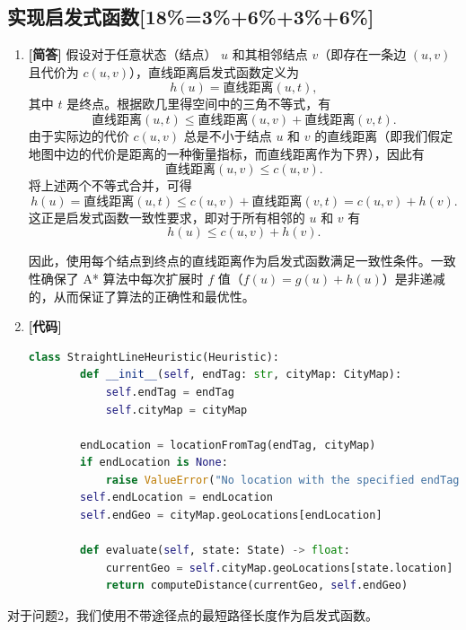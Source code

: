 \documentclass{article}
\begin{document}
\subsection{实现启发式函数[18\%=3\%+6\%+3\%+6\%]}

\begin{enumerate}[label=(\alph*), start=2]
    \item \textbf{[简答]} %
    假设对于任意状态（结点） $u$ 和其相邻结点 $v$（即存在一条边 $(u,v)$ 且代价为 $c(u,v)$），直线距离启发式函数定义为
    \[
    h(u) = \text{直线距离}(u, t),
    \]
    其中 $t$ 是终点。根据欧几里得空间中的三角不等式，有
    \[
    \text{直线距离}(u,t) \leq \text{直线距离}(u,v) + \text{直线距离}(v,t).
    \]
    由于实际边的代价 $c(u,v)$ 总是不小于结点 $u$ 和 $v$ 的直线距离（即我们假定地图中边的代价是距离的一种衡量指标，而直线距离作为下界），因此有
    \[
    \text{直线距离}(u,v) \leq c(u,v).
    \]
    将上述两个不等式合并，可得
    \[
    h(u) = \text{直线距离}(u,t) \leq c(u,v) + \text{直线距离}(v,t) = c(u,v) + h(v).
    \]
    这正是启发式函数一致性要求，即对于所有相邻的 $u$ 和 $v$ 有
    \[
    h(u) \leq c(u,v) + h(v).
    \]
    
    因此，使用每个结点到终点的直线距离作为启发式函数满足一致性条件。一致性确保了 A* 算法中每次扩展时 $f$ 值（$f(u)=g(u)+h(u)$）是非递减的，从而保证了算法的正确性和最优性。
    
    \item \textbf{[代码]} %
    \begin{lstlisting}[language=Python]
    class StraightLineHeuristic(Heuristic):
    	def __init__(self, endTag: str, cityMap: CityMap):
    		self.endTag = endTag
    		self.cityMap = cityMap
    
    	endLocation = locationFromTag(endTag, cityMap)
    	if endLocation is None:
    		raise ValueError("No location with the specified endTag found in cityMap.")
    	self.endLocation = endLocation
    	self.endGeo = cityMap.geoLocations[endLocation]
    
    	def evaluate(self, state: State) -> float:
    		currentGeo = self.cityMap.geoLocations[state.location]
    		return computeDistance(currentGeo, self.endGeo)
    \end{lstlisting}
\end{enumerate}

对于问题2，我们使用不带途径点的最短路径长度作为启发式函数。
\end{document}
